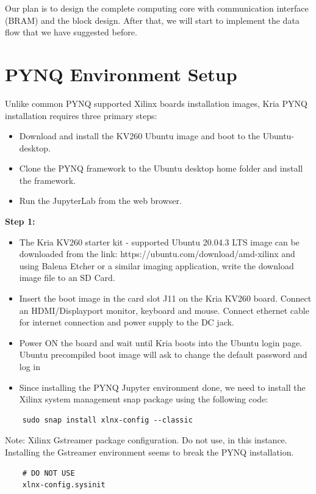 \documentclass[a4paper, 12pt]{report}
\begin{document}
Our plan is to design the complete computing core with communication interface (BRAM) and the block design. After that, we will start to implement the data flow that we have suggested before.

\appendix
\chapter{PYNQ Environment Setup}

Unlike common PYNQ supported Xilinx boards installation images, Kria PYNQ installation requires three primary steps:\cite{hackster.io}
\begin{itemize}
    \item Download and install the KV260 Ubuntu image and boot to the Ubuntu-desktop.
    \item Clone the PYNQ framework to the Ubuntu desktop home folder and install the framework.
    \item Run the JupyterLab from the web browser.
\end{itemize}
\textbf{Step 1:}
\begin{itemize}
    \item The Kria KV260 starter kit - supported Ubuntu 20.04.3 LTS image can be downloaded from the link: https://ubuntu.com/download/amd-xilinx and using Balena Etcher or a similar imaging application, write the download image file to an SD Card.
    \item Insert the boot image in the card slot J11 on the Kria KV260 board. Connect an HDMI/Displayport monitor, keyboard and mouse. Connect ethernet cable for internet connection and power supply to the DC jack.
    \item Power ON the board and wait until Kria boots into the Ubuntu login page. Ubuntu precompiled boot image will ask to change the default password and log in
    \item Since installing the PYNQ Jupyter environment done, we need to install the Xilinx system management snap package using the following code:
\end{itemize}
\begin{lstlisting}
    sudo snap install xlnx-config --classic
    \end{lstlisting}
    Note: Xilinx Gstreamer package configuration. Do not use, in this instance. Installing the Gstreamer environment seems to break the PYNQ installation.
    \begin{lstlisting}
    # DO NOT USE
    xlnx-config.sysinit
    \end{lstlisting}
\end{document}
